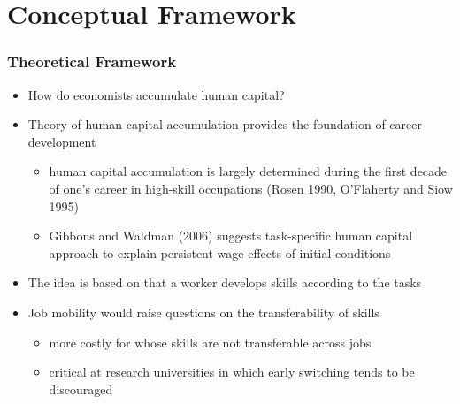 \documentclass[10pt,svgnames,fragile]{beamer}
\begin{document}
{
	\AtBeginSection{}
\section{Conceptual Framework}

\begin{frame}
	\frametitle{Theoretical Framework}
	\begin{itemize}
		\item How do economists accumulate human capital?
\vfill
		\item Theory of human capital accumulation provides the foundation of career development
		\begin{itemize}
			\item human capital accumulation is largely determined during the first decade of one's career in high-skill occupations {\small (Rosen 1990, O'Flaherty and Siow 1995)} 
				\vspace{1 mm}
			\item Gibbons and Waldman (2006) suggests task-specific human capital approach to explain persistent wage effects of initial conditions 
		\end{itemize}
\vfill
		\item The idea is based on that a worker develops skills according to the tasks
\vfill
		\item Job mobility would raise  questions on the transferability of skills 
		\begin{itemize}
			\vspace{1 mm}
			\item more costly for  whose skills are not transferable across jobs
			\vspace{1 mm}
			\item critical at research universities in which early switching tends to be discouraged 						
		\end{itemize}
\vfill
	\end{itemize}
\end{frame}






}
\end{document}
